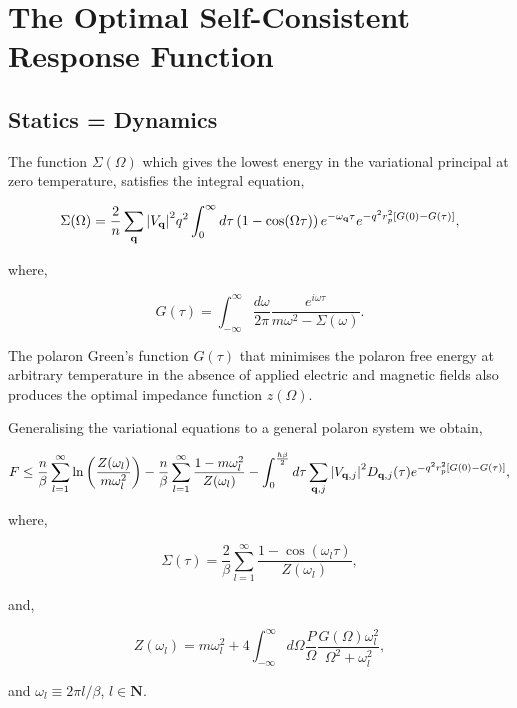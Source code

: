 \section{The Optimal Self-Consistent Response Function}
\label{sec:chap-fifth-third}

\subsection{Statics = Dynamics}

The function $\Sigma(\Omega)$ which gives the lowest energy in the variational principal at zero temperature, satisfies the integral equation,

\begin{equation}
    \Sigma(\Omega) = \frac{2}{n} \sum_{\vb{q}} \abs{V_{\vb{q}}}^2 q^2 \int^\infty_0 d\tau \left( 1 - \cos(\Omega \tau) \right)  e^{-\omega_{\vb{q}} \tau} e^{-q^2 r_p^2 [G(0) - G(\tau)]}, 
\end{equation}

where,

\begin{equation}
    G(\tau) = \int_{-\infty}^\infty \frac{d\omega}{2\pi} \frac{ e^{i \omega \tau} }{m \omega^2 - \Sigma(\omega)} .
\end{equation}

The polaron Green's function $G(\tau)$ that minimises the polaron free energy at arbitrary temperature in the absence of applied electric and magnetic fields also produces the optimal impedance function $z(\Omega)$. 
\newline

Generalising the variational equations to a general polaron system we obtain,

\begin{equation}
    F \leq \frac{n}{\beta} \sum_{l=1}^\infty \ln \left( \frac{Z(\omega_l)}{m \omega_l^2} \right) - \frac{n}{\beta} \sum_{l=1}^\infty \frac{1 - m \omega^2_l}{Z(\omega_l)} - \int_0^{\frac{\hbar\beta}{2}} d\tau \sum_{\vb{q}, j} \abs{V_{\vb{q}, j}}^2 D_{\vb{q}, j}(\tau) e^{-q^2 r_p^2 \left[G(0) - G(\tau)\right]},
\end{equation}

where,

\begin{equation}
    \Sigma(\tau) = \frac{2}{\beta} \sum_{l = 1}^\infty \frac{1 - \cos\left(\omega_l \tau \right)}{Z(\omega_l)},
\end{equation}

and,

\begin{equation}
    Z(\omega_l) = m \omega_l^2 + 4 \int_{-\infty}^\infty d\Omega \frac{P}{\Omega} \frac{G(\Omega) \omega^2_l}{\Omega^2 + \omega_l^2},
\end{equation}

and $\omega_l \equiv 2\pi l / \beta$, $l \in \mathbf{N}$.